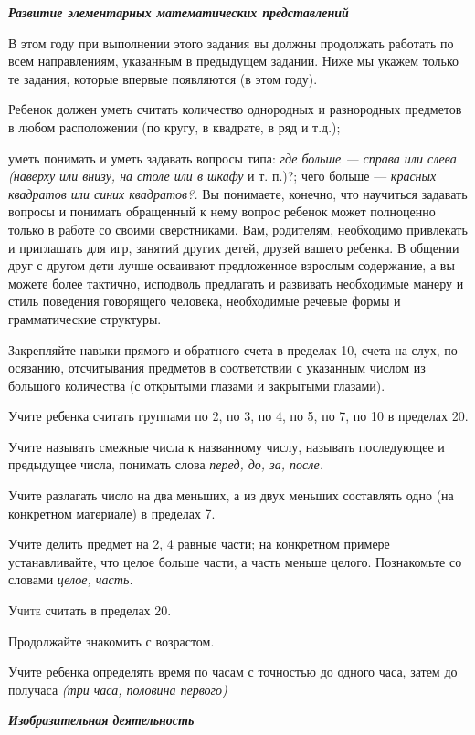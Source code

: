 \documentclass{book}
\renewcommand{\emph}[1]{\textit{#1}}
\begin{document}
\emph{\textbf{Развитие элементарных математических представлений}}

В этом году при выполнении этого задания вы должны продолжать работать
по всем направлениям, указанным в предыдущем задании. Ниже мы укажем
только те задания, которые впервые появляются (в этом году).

Ребенок должен уметь считать количество однородных и разнородных
предметов в любом расположении (по кругу, в квадрате, в ряд и т.д.);

уметь понимать и уметь задавать вопросы типа: \emph{где больше ---
справа или слева (наверху или внизу, на столе или в шкафу} и т. п.)?;
чего больше --- \emph{красных квадратов или синих квадратов?.} Вы
понимаете, конечно, что научиться задавать вопросы и понимать обращенный
к нему вопрос ребенок может полноценно только в работе со своими
сверстниками. Вам, родителям, необходимо привлекать и приглашать для
игр, занятий других детей, друзей вашего ребенка. В общении друг с
другом дети лучше осваивают предложенное взрослым содержание, а вы
можете более тактично, исподволь предлагать и развивать необходимые
манеру и стиль поведения говорящего человека, необходимые речевые формы
и грамматические структуры.

Закрепляйте навыки прямого и обратного счета в пределах 10, счета на
слух, по осязанию, отсчитывания предметов в соответствии с указанным
числом из большого количества (с открытыми глазами и закрытыми глазами).

Учите ребенка считать группами по 2, по 3, по 4, по 5, по 7, по 10 в
пределах 20.

Учите называть смежные числа к названному числу, называть последующее и
предыдущее числа, понимать слова \emph{перед, до, за, после.}

Учите разлагать число на два меньших, а из двух меньших составлять одно
(на конкретном материале) в пределах 7.

Учите делить предмет на 2, 4 равные части; на конкретном примере
устанавливайте, что целое больше части, а часть меньше целого.
Познакомьте со словами \emph{целое, часть.}

\textsc{Учите} считать в пределах 20.

Продолжайте знакомить с возрастом.

Учите ребенка определять время по часам с точностью до одного часа,
затем до получаса \emph{(три часа, половина первого)}

\emph{\textbf{Изобразительная} \textbf{деятельность}}
\end{document}

